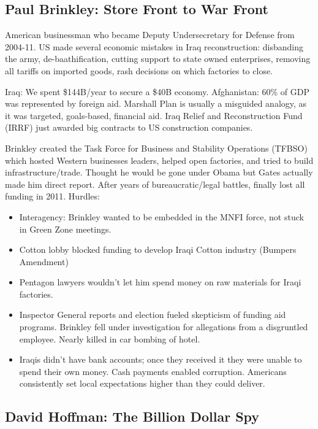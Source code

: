 \documentclass[
]{article}
\begin{document}
\hypertarget{paul-brinkley-store-front-to-war-front}{%
\subsection{Paul Brinkley: Store Front to War
Front}\label{paul-brinkley-store-front-to-war-front}}

American businessman who became Deputy Undersecretary for Defense from
2004-11. US made several economic mistakes in Iraq reconstruction:
disbanding the army, de-baathification, cutting support to state owned
enterprises, removing all tariffs on imported goods, rash decisions on
which factories to close.

Iraq: We spent \$144B/year to secure a \$40B economy. Afghanistan: 60\%
of GDP was represented by foreign aid. Marshall Plan is usually a
misguided analogy, as it was targeted, goals-based, financial aid. Iraq
Relief and Reconstruction Fund (IRRF) just awarded big contracts to US
construction companies.

Brinkley created the Task Force for Business and Stability Operations
(TFBSO) which hosted Western businesses leaders, helped open factories,
and tried to build infrastructure/trade. Thought he would be gone under
Obama but Gates actually made him direct report. After years of
bureaucratic/legal battles, finally lost all funding in 2011. Hurdles:

\begin{itemize}
\item
  Interagency: Brinkley wanted to be embedded in the MNFI force, not
  stuck in Green Zone meetings.
\item
  Cotton lobby blocked funding to develop Iraqi Cotton industry (Bumpers
  Amendment)
\item
  Pentagon lawyers wouldn't let him spend money on raw materials for
  Iraqi factories.
\item
  Inspector General reports and election fueled skepticism of funding
  aid programs. Brinkley fell under investigation for allegations from a
  disgruntled employee. Nearly killed in car bombing of hotel.
\item
  Iraqis didn't have bank accounts; once they received it they were
  unable to spend their own money. Cash payments enabled corruption.
  Americans consistently set local expectations higher than they could
  deliver.
\end{itemize}

\hypertarget{david-hoffman-the-billion-dollar-spy}{%
\subsection{David Hoffman: The Billion Dollar
Spy}\label{david-hoffman-the-billion-dollar-spy}}
\end{document}
